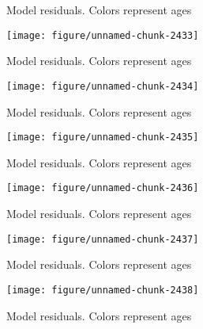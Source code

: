 \documentclass[a4paper]{article}\usepackage{graphicx, color}
\makeatletter
\def\maxwidth{ %
  \ifdim\Gin@nat@width>\linewidth
    \linewidth
  \else
    \Gin@nat@width
  \fi
}
\newenvironment{knitrout}{}{} %
\makeatother
\begin{document}
\begin{knitrout}
\begin{figure}[H]
\caption[Model residuals]{Model residuals. Colors represent ages\label{fig:unnamed-chunk-2432}}
\end{figure}
\begin{figure}[H]


{\centering \texttt{[image: figure/unnamed-chunk-2433]} 

}

\caption[Model residuals]{Model residuals. Colors represent ages\label{fig:unnamed-chunk-2433}}
\end{figure}
\begin{figure}[H]


{\centering \texttt{[image: figure/unnamed-chunk-2434]} 

}

\caption[Model residuals]{Model residuals. Colors represent ages\label{fig:unnamed-chunk-2434}}
\end{figure}
\begin{figure}[H]


{\centering \texttt{[image: figure/unnamed-chunk-2435]} 

}

\caption[Model residuals]{Model residuals. Colors represent ages\label{fig:unnamed-chunk-2435}}
\end{figure}
\begin{figure}[H]


{\centering \texttt{[image: figure/unnamed-chunk-2436]} 

}

\caption[Model residuals]{Model residuals. Colors represent ages\label{fig:unnamed-chunk-2436}}
\end{figure}
\begin{figure}[H]


{\centering \texttt{[image: figure/unnamed-chunk-2437]} 

}

\caption[Model residuals]{Model residuals. Colors represent ages\label{fig:unnamed-chunk-2437}}
\end{figure}
\begin{figure}[H]


{\centering \texttt{[image: figure/unnamed-chunk-2438]} 

}

\caption[Model residuals]{Model residuals. Colors represent ages\label{fig:unnamed-chunk-2438}}
\end{figure}
\begin{figure}[H]



\end{figure}
\end{knitrout}
\end{document}
